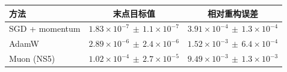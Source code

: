\begin{tabular}{lcc}\toprule
方法 & 末点目标值 & 相对重构误差 \\ \midrule
SGD + momentum & $1.83\times10^{-7}\,\pm\,1.1\times10^{-7}$ & $3.91\times10^{-4}\,\pm\,1.3\times10^{-4}$ \\
AdamW & $2.89\times10^{-6}\,\pm\,2.4\times10^{-6}$ & $1.52\times10^{-3}\,\pm\,6.4\times10^{-4}$ \\
Muon (NS5) & $1.02\times10^{-4}\,\pm\,2.7\times10^{-5}$ & $9.49\times10^{-3}\,\pm\,1.3\times10^{-3}$ \\
\bottomrule\end{tabular}
